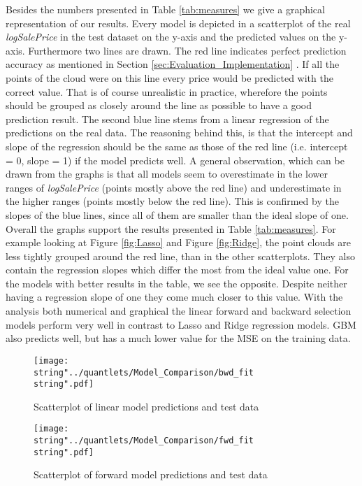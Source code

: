 Besides the numbers presented in Table \ref{tab:measures} we give a graphical representation of our results. Every model is depicted in a scatterplot of the real \textit{logSalePrice} in the test dataset on the y-axis and the predicted values on the y-axis. Furthermore two lines are drawn. The red line indicates perfect prediction accuracy as mentioned in Section \ref{sec:Evaluation_Implementation} . If all the points of the cloud were on this line every price would be predicted with the correct value. That is of course unrealistic in practice, wherefore the points should be grouped as closely around the line as possible to have a good prediction result. The second blue line stems from a linear regression of the predictions on the real data. The reasoning behind this, is that the intercept and slope of the regression should be the same as those of the red line (i.e. intercept = 0, slope = 1) if the model predicts well. A general observation, which can be drawn from the graphs is that all models seem to overestimate in the lower ranges of \textit{logSalePrice} (points mostly above the red line) and underestimate in the higher ranges (points mostly below the red line). This is confirmed by the slopes of the blue lines, since all of them are smaller than the ideal slope of one. Overall the graphs support the results presented in Table \ref{tab:measures}. For example looking at Figure \ref{fig:Lasso} and Figure \ref{fig:Ridge}, the point clouds are less tightly grouped around the red line, than in the other scatterplots. They also contain the regression slopes  which differ the most from the ideal value one. For the models with better results in the table, we see the opposite. Despite neither having a regression slope of one they come much closer to this value. With the analysis both numerical and graphical the linear forward and backward selection models perform very well in contrast to Lasso and Ridge regression models. GBM also predicts well, but has  a much lower value for the MSE on the training data.




\begin{figure}[H]
\centering
	\texttt{[image: \\string"../quantlets/Model\_Comparison/bwd\_fit\\string".pdf]}
  	\caption{Scatterplot of linear model predictions and test data}
  	\label{fig:lm}
\end{figure}

\begin{figure}[H]
\centering
	\texttt{[image: \\string"../quantlets/Model\_Comparison/fwd\_fit\\string".pdf]}
  	\caption{Scatterplot of forward model predictions and test data}
  	\label{fig:fwd}
\end{figure}

